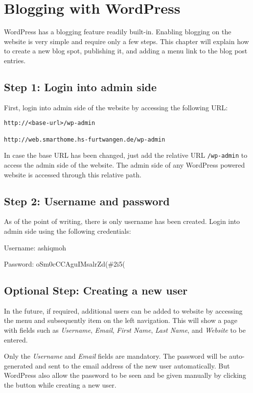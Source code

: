 \chapter{Blogging with WordPress}
WordPress has a blogging feature readily built-in. Enabling blogging on the website is very simple and require only a few steps. This chapter will explain how to create a new blog spot, publishing it, and adding a menu link to the blog post entries.

\section*{Step 1: Login into admin side}
First, login into admin side of the website by accessing the following URL:
\begin{lstlisting}
http://<base-url>/wp-admin

http://web.smarthome.hs-furtwangen.de/wp-admin
\end{lstlisting}

In case the base URL has been changed, just add the relative URL \texttt{/wp-admin} to access the admin side of the website. The admin side of any WordPress powered website is accessed through this relative path.

\section*{Step 2: Username and password}
As of the point of writing, there is only username has been created. Login into admin side using the following credentials:
\begin{itemize*}
\item Username: ashiqmoh
\item Password: oSm0cCCAguIMsalrZd(\#2i5(
\end{itemize*}

\section*{Optional Step: Creating a new user}
In the future, if required, additional users can be added to website by accessing the  menu and subsequently  item on the left navigation. This will show a page with fields such as \emph{Username}, \emph{Email}, \emph{First Name}, \emph{Last Name}, and \emph{Website} to be entered.

Only the \emph{Username} and \emph{Email} fields are mandatory. The password will be auto-generated and sent to the email address of the new user automatically. But WordPress also allow the password to be seen and be given manually by clicking the  button while creating a new user.


